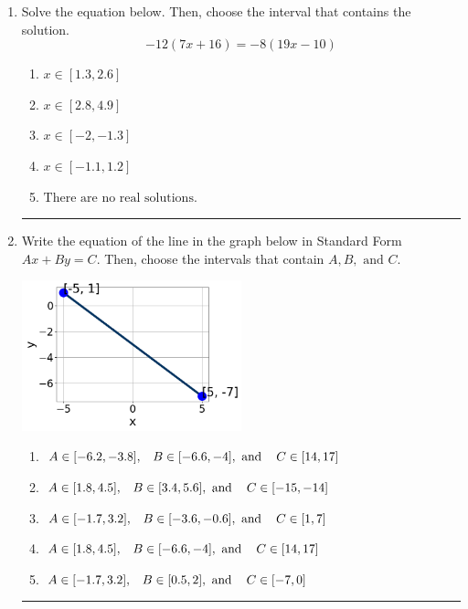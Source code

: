 \documentclass[14pt]{extbook}
\newcommand{\litem}[1]{\item#1\hspace*{-1cm}\rule{\textwidth}{0.4pt}}
\begin{document}
\begin{enumerate}
\litem{
Solve the equation below. Then, choose the interval that contains the solution.\[ -12(7x + 16) = -8(19x -10) \]\begin{enumerate}[label=\Alph*.]
\item \( x \in [1.3, 2.6] \)
\item \( x \in [2.8, 4.9] \)
\item \( x \in [-2, -1.3] \)
\item \( x \in [-1.1, 1.2] \)
\item \( \text{There are no real solutions.} \)

\end{enumerate} }
\litem{
Write the equation of the line in the graph below in Standard Form $Ax+By=C$. Then, choose the intervals that contain $A, B, \text{ and } C$.
\begin{center}
    \includegraphics[width=0.5\textwidth]{../Figures/linearGraphToStandardCopyA.png}
\end{center}
\begin{enumerate}[label=\Alph*.]
\item \( A \in [-6.2, -3.8], \hspace{3mm} B \in [-6.6, -4], \text{ and } \hspace{3mm} C \in [14, 17] \)
\item \( A \in [1.8, 4.5], \hspace{3mm} B \in [3.4, 5.6], \text{ and } \hspace{3mm} C \in [-15, -14] \)
\item \( A \in [-1.7, 3.2], \hspace{3mm} B \in [-3.6, -0.6], \text{ and } \hspace{3mm} C \in [1, 7] \)
\item \( A \in [1.8, 4.5], \hspace{3mm} B \in [-6.6, -4], \text{ and } \hspace{3mm} C \in [14, 17] \)
\item \( A \in [-1.7, 3.2], \hspace{3mm} B \in [0.5, 2], \text{ and } \hspace{3mm} C \in [-7, 0] \)


\end{enumerate}}
\end{enumerate}
\end{document}
